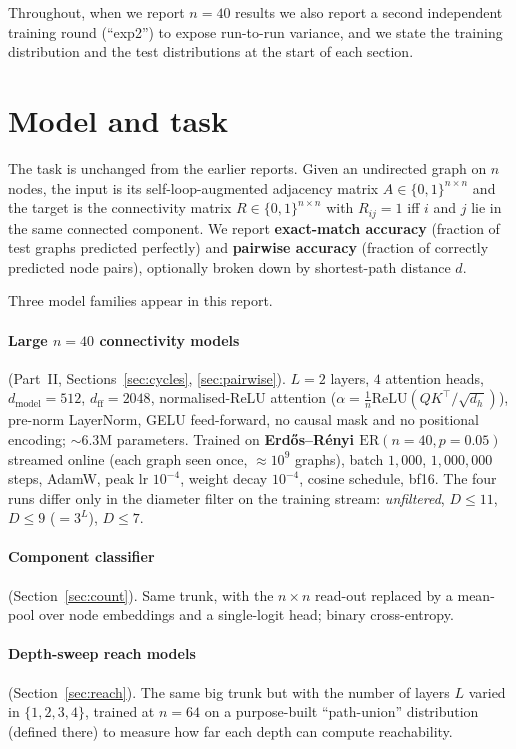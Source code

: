 \documentclass[11pt,a4paper]{article}
\begin{document}
Throughout, when we report $n = 40$ results we also report a second independent
training round (``exp2'') to expose run-to-run variance, and we state the
training distribution and the test distributions at the start of each section.

\section{Model and task}
\label{sec:model}

The task is unchanged from the earlier reports. Given an undirected graph on $n$
nodes, the input is its self-loop-augmented adjacency matrix
$A \in \{0,1\}^{n \times n}$ and the target is the connectivity matrix
$R \in \{0,1\}^{n \times n}$ with $R_{ij} = 1$ iff $i$ and $j$ lie in the same
connected component. We report \textbf{exact-match accuracy} (fraction of test
graphs predicted perfectly) and \textbf{pairwise accuracy} (fraction of
correctly predicted node pairs), optionally broken down by shortest-path
distance $d$.

Three model families appear in this report.

\paragraph{Large $n = 40$ connectivity models} (Part~II,
Sections~\ref{sec:cycles}, \ref{sec:pairwise}). $L = 2$ layers, $4$ attention
heads, $d_{\mathrm{model}} = 512$, $d_{\mathrm{ff}} = 2048$, normalised-ReLU
attention ($\alpha = \tfrac{1}{n}\mathrm{ReLU}(QK^\top/\sqrt{d_h})$), pre-norm
LayerNorm, GELU feed-forward, no causal mask and no positional encoding;
$\sim 6.3$M parameters. Trained on \textbf{Erd\H{o}s--R\'enyi
$\mathrm{ER}(n = 40, p = 0.05)$} streamed online (each graph seen once,
$\approx 10^9$ graphs), batch $1{,}000$, $1{,}000{,}000$ steps, AdamW, peak lr
$10^{-4}$, weight decay $10^{-4}$, cosine schedule, bf16. The four runs differ
only in the diameter filter on the training stream: \emph{unfiltered}, $D \le
11$, $D \le 9$ ($= 3^L$), $D \le 7$.

\paragraph{Component classifier} (Section~\ref{sec:count}). Same trunk, with the
$n \times n$ read-out replaced by a mean-pool over node embeddings and a
single-logit head; binary cross-entropy.

\paragraph{Depth-sweep reach models} (Section~\ref{sec:reach}). The same big
trunk but with the number of layers $L$ varied in $\{1,2,3,4\}$, trained at
$n = 64$ on a purpose-built ``path-union'' distribution (defined there) to
measure how far each depth can compute reachability.
\end{document}
